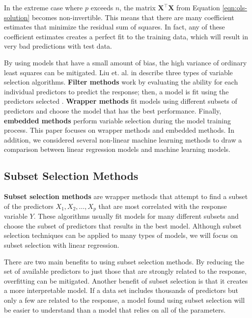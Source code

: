 \documentclass{article}
\begin{document}
In the extreme case where $p$ exceeds $n$, the matrix $\mathbf{X}^\top \mathbf{X}$ from Equation \ref{eqn:ols-solution} becomes non-invertible. This means that there are many coefficient estimates that minimize the residual sum of squares. In fact, any of these coefficient estimates creates a perfect fit to the training data, which will result in very bad predictions with test data.

By using models that have a small amount of bias, the high variance of ordinary least squares can be mitigated. Liu et. al. in \cite{liu2020logsum} describe three types of variable selection algorithms. \textbf{Filter methods} work by evaluating the ability for each individual predictors to predict the response; then, a model is fit using the predictors selected \cite{sanchez2007filter, ding2005minimum}. \textbf{Wrapper methods} fit models using different subsets of predictors and choose the model that has the best performance. Finally, \textbf{embedded methods} perform variable selection during the model training process. This paper focuses on wrapper methods and embedded methods. In addition, we considered several non-linear machine learning methods to draw a comparison between linear regression models and machine learning models.

\subsection{Subset Selection Methods}

\textbf{Subset selection methods} are wrapper methods that attempt to find a subset of the predictors $X_1, X_2, \dotsc, X_p$ that are most correlated with the response variable $Y$. These algorithms usually fit models for many different subsets and choose the subset of predictors that results in the best model. Although subset selection techniques can be applied to many types of models, we will focus on subset selection with linear regression.

There are two main benefits to using subset selection methods. By reducing the set of available predictors to just those that are strongly related to the response, overfitting can be mitigated. Another benefit of subset selection is that it creates a more interpretable model. If a data set includes thousands of predictors but only a few are related to the response, a model found using subset selection will be easier to understand than a model that relies on all of the parameters. 
\end{document}
